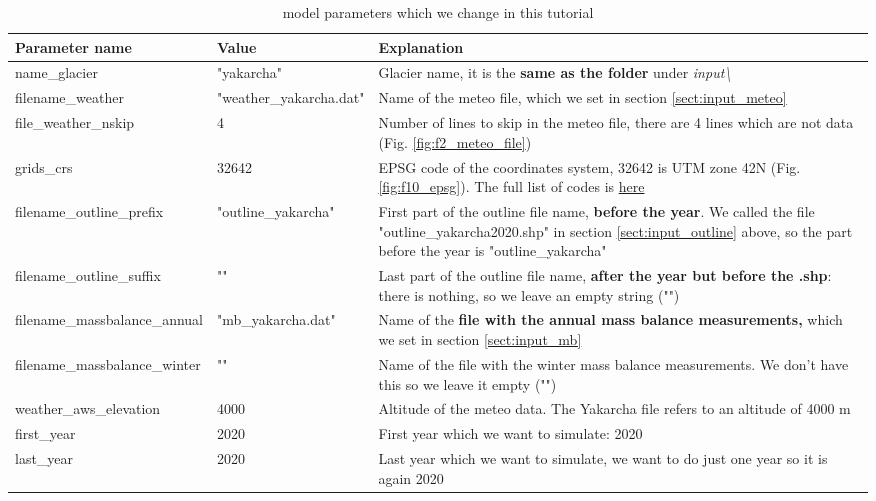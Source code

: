 \documentclass[15pt]{extarticle}
\begin{document}
\begin{table}[h]
\caption{model parameters which we change in this tutorial}
\label{table:t1_parameters}
\centering
\begin{tabularx}{\textwidth}{|l l X|} 
 \hline
 \textbf{Parameter name} & \textbf{Value} & \textbf{Explanation} \\ [0.5ex] 
 \hline
 name\_glacier & "yakarcha" & Glacier name, it is the \textbf{same as the folder} under \textit{input\textbackslash} \\ 
 \hline
 filename\_weather & "weather\_yakarcha.dat" & Name of the meteo file, which we set in section \ref{sect:input_meteo} \\
 \hline
 file\_weather\_nskip & 4 & Number of lines to skip in the meteo file, there are 4 lines which are not data (Fig. \ref{fig:f2_meteo_file}) \\
 \hline
 grids\_crs & 32642 & EPSG code of the coordinates system, 32642 is UTM zone 42N (Fig. \ref{fig:f10_epsg}). The full list of codes is \href{https://spatialreference.org/ref/epsg/?page=80}{here} \\
 \hline
 filename\_outline\_prefix & "outline\_yakarcha" & First part of the outline file name, \textbf{before the year}. We called the file "outline\_yakarcha2020.shp" in section \ref{sect:input_outline} above, so the part before the year is "outline\_yakarcha"\\
 \hline
 filename\_outline\_suffix & "" & Last part of the outline file name, \textbf{after the year but before the .shp}: there is nothing, so we leave an empty string ("")\\
 \hline
 filename\_massbalance\_annual & "mb\_yakarcha.dat" & Name of the \textbf{file with the annual mass balance measurements,} which we set in section \ref{sect:input_mb}\\
 \hline
  filename\_massbalance\_winter & "" & Name of the file with the winter mass balance measurements. We don't have this so we leave it empty ("")\\
 \hline
  weather\_aws\_elevation & 4000 & Altitude of the meteo data. The Yakarcha file refers to an altitude of 4000 m\\
 \hline
  first\_year & 2020 & First year which we want to simulate: 2020\\
 \hline
  last\_year & 2020 & Last year which we want to simulate, we want to do just one year so it is again 2020\\
 \hline
\end{tabularx}
\end{table}
\end{document}
